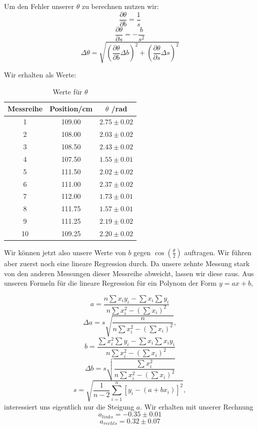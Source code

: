 \documentclass[11pt,a4paper]{article}
\begin{document}
Um den Fehler unserer $\theta$ zu berechnen nutzen wir:
\[
\frac{\partial\theta}{\partial b}=\frac{1}{s}
\]
\[
\frac{\partial\theta}{\partial s}=-\frac{b}{s^2}
\]
\[
\Delta\theta=\sqrt{\left(\frac{\partial\theta}{\partial b}\Delta b\right)^2+\left(\frac{\partial\theta}{\partial s}\Delta s\right)^2}
\]

\pagebreak

Wir erhalten als Werte:

\begin{table}[h]
\centering
\caption{Werte f\"ur $\theta$} \vspace{11pt}
\begin{tabular}{ccc}
\toprule
\textrm{Messreihe} & \textrm{Position}/\textrm{cm} & $\theta$ /\textrm{rad} \\
\midrule 
1 & 109.00 & $2.75\pm0.02$ \\
2 & 108.00 & $2.03\pm0.02$ \\
3 & 108.50 & $2.43\pm0.02$ \\
4 & 107.50 & $1.55\pm0.01$\\
5 & 111.50 & $2.02\pm0.02$ \\
6 & 111.00 & $2.37\pm0.02$\\
7 & 112.00 & $1.73\pm0.01$ \\
8 & 111.75 & $1.57\pm0.01$ \\
9 & 111.25 & $2.19\pm0.02$ \\
10 & 109.25 & $2.20\pm0.02$ \\ 
\bottomrule
\end{tabular}
\label{Tab:2}
\end{table}

Wir k\"onnen jetzt also unsere Werte von $b$ gegen $\cos\left(\frac{\theta}{2}\right)$ auftragen. Wir f\"uhren aber zuerst noch eine lineare Regression durch. Da unsere zehnte Messung stark von den anderen Messungen dieser Messreihe abweicht, lassen wir diese raus. Aus unseren Formeln f\"ur die lineare Regression f\"ur ein Polynom der Form $y=ax+b$,

\begin{equation}
a=\frac{n\sum x_iy_i-\sum x_i\sum y_i}{n\sum x_i^2-(\sum x_i)^2}
\end{equation}
\begin{equation}
\Delta a=s\sqrt{\frac{n}{n\sum x_i^2-(\sum x_i)^2}},
\end{equation}
\begin{equation}
b=\frac{\sum x_i^2\sum y_i-\sum x_i\sum x_iy_i}{n\sum x_i^2-(\sum x_i)^2}
\end{equation}
\begin{equation}
\Delta b=s\sqrt{\frac{\sum x_i^2}{n\sum x_i^2-(\sum x_i)^2}}
\end{equation}
\begin{equation}
s=\sqrt{\frac{1}{n-2}\sum^n_{i=1}[y_i-(a+bx_i)]^2},
\end{equation}
interessiert uns eigentlich nur die Steigung $a$. Wir erhalten mit unserer Rechnung
\[a_{links}=-0.35\pm0.01\]
\[a_{rechts}=0.32\pm0.07\]
\end{document}
